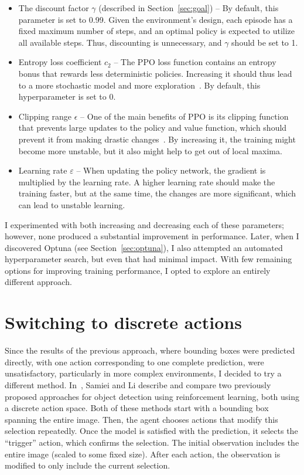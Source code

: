 \documentclass[
  digital,     %
  oneside,     %
  nosansbold,  %
  nocolorbold, %
  lof,         %
  lot,         %
]{fithesis4}
\begin{document}
\begin{itemize}
    \item The discount factor $\gamma$ (described in Section~\ref{sec:goal}) -- By default, this parameter is set to 0.99. Given the environment’s design, each episode has a fixed maximum number of steps, and an optimal policy is expected to utilize all available steps. Thus, discounting is unnecessary, and $\gamma$ should be set to 1.
    \item Entropy loss coefficient $c_2$ -- The PPO loss function contains an entropy bonus that rewards less deterministic policies. Increasing it should thus lead to a more stochastic model and more exploration~\cite{PPO_paper}. By default, this hyperparameter is set to 0.
    \item Clipping range $\epsilon$ -- One of the main benefits of PPO is its clipping function that prevents large updates to the policy and value function, which should prevent it from making drastic changes~\cite{PPO_paper}. By increasing it, the training might become more unstable, but it also might help to get out of local maxima.
    \item Learning rate $\varepsilon$ -- When updating the policy network, the gradient is multiplied by the learning rate. A higher learning rate should make the training faster, but at the same time, the changes are more significant, which can lead to unstable learning.
\end{itemize}

I experimented with both increasing and decreasing each of these parameters; however, none produced a substantial improvement in performance. Later, when I discovered Optuna (see Section~\ref{sec:optuna}), I also attempted an automated hyperparameter search, but even that had minimal impact. With few remaining options for improving training performance, I opted to explore an entirely different approach.

\section{Switching to discrete actions}
\label{sec:iterative}

Since the results of the previous approach, where bounding boxes were predicted directly, with one action corresponding to one complete prediction, were unsatisfactory, particularly in more complex environments, I decided to try a different method. In~\cite{rl_object_detection}, Samiei and Li describe and compare two previously proposed approaches for object detection using reinforcement learning, both using a discrete action space. Both of these methods start with a bounding box spanning the entire image. Then, the agent chooses actions that modify this selection repeatedly. Once the model is satisfied with the prediction, it selects the \enquote{trigger} action, which confirms the selection. The initial observation includes the entire image (scaled to some fixed size). After each action, the observation is modified to only include the current selection.
\end{document}
